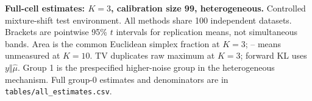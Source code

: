\textbf{Full-cell estimates: $K=3$, calibration size 99, heterogeneous.} Controlled mixture-shift test environment. All methods share 100 independent datasets. Brackets are pointwise 95\% $t$ intervals for replication means, not simultaneous bands. Area is the common Euclidean simplex fraction at $K=3$; -- means unmeasured at $K=10$. TV duplicates raw maximum at $K=3$; forward KL uses $y\Vert\hat\mu$. Group 1 is the prespecified higher-noise group in the heterogeneous mechanism. Full group-0 estimates and denominators are in \texttt{tables/all\_estimates.csv}.
